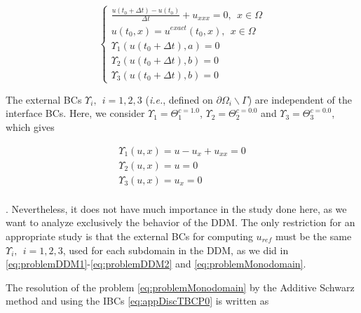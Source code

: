 \begin{equation}
	\label{eq:problemMonodomain}
	\begin{cases}
	\frac{u(t_0+\Delta t) - u(t_0)}{\Delta t} + u_{xxx} = 0, \ \ x \in \Omega\\
	u(t_0,x) = u^{exact}(t_0,x) , \ \ x \in \Omega \\ 
	\Upsilon_1(u(t_0 + \Delta t),a) = 0\\
	\Upsilon_2(u(t_0 + \Delta t),b) = 0\\
	\Upsilon_3(u(t_0 + \Delta t),b) = 0
	\end{cases}
\end{equation}

\indent The external BCs $ \Upsilon_i, \ \ i=1,2,3$ (\emph{i.e.}, defined on $\partial \Omega_i \backslash \Gamma$) are independent of the interface BCs. Here, we consider $\Upsilon_1 = \Theta_1^{c = 1.0}$, $\Upsilon_2 = \Theta_2^{c = 0.0}$ and $\Upsilon_3 = \Theta_3^{c = 0.0}$, which gives

\begin{equation*}
	\begin{gathered}
	\Upsilon_1(u,x) = u - u_x + u_{xx} = 0\\
	\Upsilon_2(u,x) = u = 0\\
	\Upsilon_3(u,x) = u_x = 0\\
	\end{gathered}
\end{equation*}

\indent {} . Nevertheless, it does not have much importance in the study done here, as we want to analyze exclusively the behavior of the DDM. The only restriction for an appropriate study is that the external BCs for computing $u_{ref}$ must be the same $\Upsilon_i, \ \ i=1,2,3$, used for each subdomain in the DDM, as we did in \eqref{eq:problemDDM1}-\eqref{eq:problemDDM2} and \eqref{eq:problemMonodomain}.

\indent The resolution of the problem \eqref{eq:problemMonodomain} by the Additive Schwarz method and using the IBCs \eqref{eq:appDiscTBCP0} is written as

